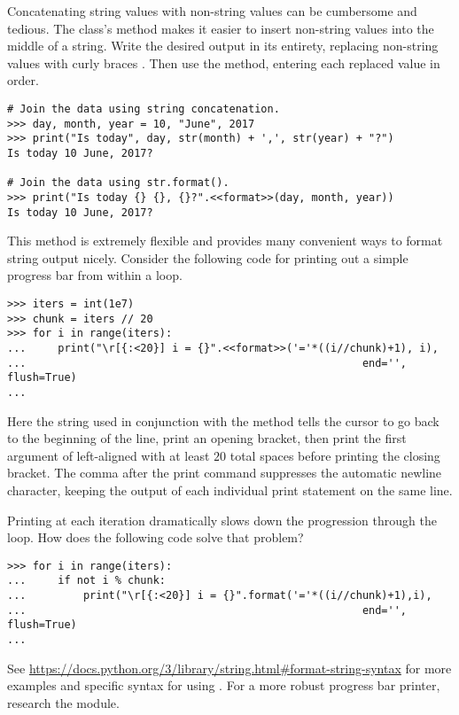 Concatenating string values with non-string values can be cumbersome and tedious.
The  class's  method makes it easier to insert non-string values into the middle of a string.
Write the desired output in its entirety, replacing non-string values with curly braces \li{\{\}}.
Then use the  method, entering each replaced value in order.

\begin{lstlisting}
# Join the data using string concatenation.
>>> day, month, year = 10, "June", 2017
>>> print("Is today", day, str(month) + ',', str(year) + "?")
Is today 10 June, 2017?

# Join the data using str.format().
>>> print("Is today {} {}, {}?".<<format>>(day, month, year))
Is today 10 June, 2017?
\end{lstlisting}

This method is extremely flexible and provides many convenient ways to format string output nicely.
Consider the following code for printing out a simple progress bar from within a loop.

\begin{lstlisting}
>>> iters = int(1e7)
>>> chunk = iters // 20
>>> for i in range(iters):
...     print("\r[{:<20}] i = {}".<<format>>('='*((i//chunk)+1), i),
...                                                     end='', flush=True)
...
\end{lstlisting}

Here the string  used in conjunction with the  method tells the cursor to go back to the beginning of the line, print an opening bracket, then print the first argument of  left-aligned with at least $20$ total spaces before printing the closing bracket.
The comma after the print command suppresses the automatic newline character, keeping the output of each individual print statement on the same line.

Printing at each iteration dramatically slows down the progression through the loop.
How does the following code solve that problem?

\begin{lstlisting}
>>> for i in range(iters):
...     if not i % chunk:
...         print("\r[{:<20}] i = {}".format('='*((i//chunk)+1),i),
...                                                     end='', flush=True)
...
\end{lstlisting}

See \url{https://docs.python.org/3/library/string.html\#format-string-syntax} for more examples and specific syntax for using .
For a more robust progress bar printer, research the  module.

